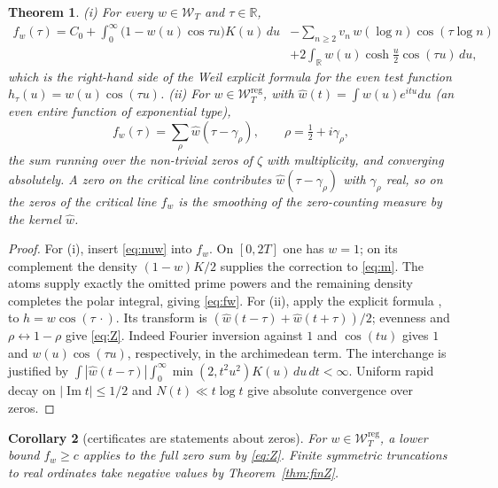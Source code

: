 \documentclass[10pt]{amsart}
\newtheorem{theorem}{Theorem}[section]
\newtheorem{corollary}[theorem]{Corollary}
\theoremstyle{definition}
\theoremstyle{remark}
\newcommand{\R}{\mathbb R}
\newcommand{\Iml}{\operatorname{Im}}
\newcommand{\wh}{\widehat w}
\newcommand{\Wcl}{\mathcal W_T}
\begin{document}
\begin{theorem}\label{thm:Z}
\emph{(i)} For every $w\in\Wcl$ and $\tau\in\R$,
\begin{equation}\label{eq:fw}
\begin{split}
f_w(\tau)=C_0+\int_0^\infty\big(1-w(u)\cos\tau u\big)K(u)\,du&-\sum_{n\ge2}v_n\,w(\log n)\cos(\tau\log n)\\
&+2\int_\R w(u)\cosh\tfrac u2\cos(\tau u)\,du,
\end{split}
\end{equation}
which is the right-hand side of the Weil explicit formula for the even test function
$h_\tau(u)=w(u)\cos(\tau u)$.
\emph{(ii)} For $w\in\Wcl^{\mathrm{reg}}$, with $\wh(t)=\int w(u)e^{itu}du$ (an even entire function
of exponential type),
\begin{equation}\label{eq:Z}
f_w(\tau)=\sum_\rho\wh(\tau-\gamma_\rho),\qquad\rho=\tfrac12+i\gamma_\rho,
\end{equation}
the sum running over the non-trivial zeros of $\zeta$ with multiplicity, and converging absolutely.
A zero on the critical line contributes $\wh(\tau-\gamma_\rho)$ with $\gamma_\rho$ real, so on
the zeros of the critical line $f_w$ is the smoothing of the zero-counting measure by the kernel $\wh$.
\end{theorem}
\begin{proof}
For (i), insert \eqref{eq:nuw} into $f_w$. On $[0,2T]$ one has $w=1$;
on its complement the density $(1-w)K/2$ supplies the correction to
\eqref{eq:m}. The atoms supply exactly the omitted prime powers and the
remaining density completes the polar integral, giving \eqref{eq:fw}.
For (ii), apply the explicit formula \cite{Weil52}, \cite[Thm.~5.11]{IK}
to $h=w\cos(\tau\,\cdot)$. Its transform is
$(\wh(t-\tau)+\wh(t+\tau))/2$; evenness and $\rho\leftrightarrow1-\rho$
give \eqref{eq:Z}. Indeed Fourier inversion against $1$ and $\cos(tu)$
gives $1$ and $w(u)\cos(\tau u)$, respectively, in the archimedean
term. The interchange is justified by
$\int|\wh(t-\tau)|\int_0^\infty\min(2,t^2u^2)K(u)\,du\,dt<\infty$.
Uniform rapid decay on $|\Iml t|\le1/2$ and $N(t)\ll t\log t$
give absolute convergence over zeros.
\end{proof}


\begin{corollary}[certificates are statements about zeros]\label{cor:zeros}
For $w\in\Wcl^{\mathrm{reg}}$, a lower bound $f_w\ge c$ applies
to the full zero sum by \eqref{eq:Z}. Finite symmetric truncations
to real ordinates take negative values by Theorem~\ref{thm:finZ}.
\end{corollary}
\end{document}
